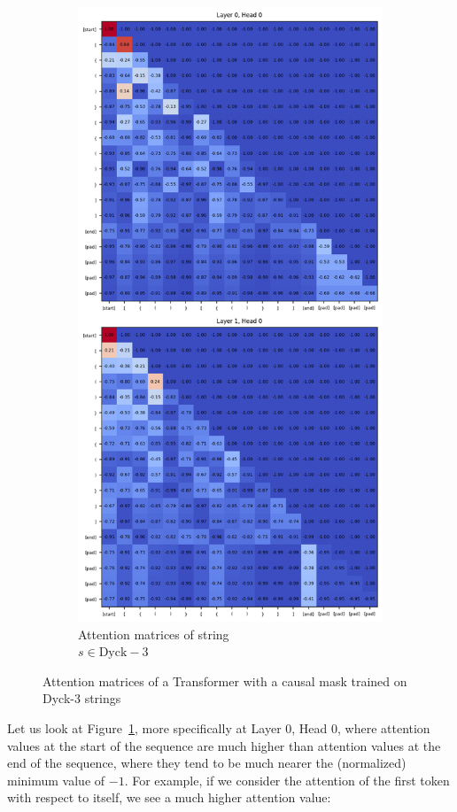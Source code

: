 \begin{figure}[h]
\begin{subfigure}{.5\textwidth}
      \includegraphics[width=.8\linewidth]{docs/figs/dyck_3/causal_seq_2_dyck_3.png}
      \caption{Attention matrices of string \\ $s \in \text{Dyck}-3$}
      \label{fig:pos-causal-dyck-3}
    \end{subfigure}
    \caption{Attention matrices of a Transformer with a causal mask trained on Dyck-3 strings}
    \label{fig:causal-dyck-3}
\end{figure}

Let us look at Figure~\ref{fig:pos-causal-dyck-3}, more specifically at Layer 0, Head 0, where attention values at the start of the sequence are much higher than attention values at the end of the sequence, where they tend to be much nearer the (normalized) minimum value of $-1$. For example, if we consider the attention of the first token with respect to itself, we see a much higher attention value: 

